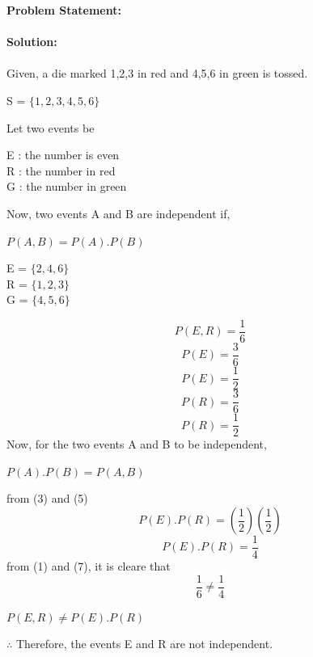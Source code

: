 \documentclass[10pt,a4paper]{report}
\begin{document}
\begin{multicols}{2}
\textbf{Problem Statement:}\vspace{2mm}
\\
\\
\textbf{Solution:}
\\
\\
Given, a die marked 1,2,3 in red and 4,5,6 in green is tossed.\\
\begin{center}
S = $\{1,2,3,4,5,6\}$
\end{center}
Let two events be
\begin{center}
E : the number is even\\
R : the number in red\\
G : the number in green\\
\end{center}
Now, two events A and B are independent if,
\begin{center} 
$\boxed{P(A,B) = P(A).P(B)}$
\end{center}
\begin{center} 
E = $\{2,4,6\}$\\
R = $\{1,2,3\}$\\
G = $\{4,5,6\}$
\end{center}
\begin{equation}
P(E,R) = \frac{1}{6}
\end{equation}
\begin{equation}
P(E) = \frac{3}{6}
\end{equation}
\begin{equation}
P(E) = \frac{1}{2}
\end{equation}
\begin{equation}
P(R) = \frac{3}{6}
\end{equation}
\begin{equation}
P(R) = \frac{1}{2}
\end{equation}
Now, for the two events A and B to be independent,
\begin{center} 
$P(A).P(B) = P(A,B)$
\end{center}
from  (3) and (5)
\begin{equation}
P(E).P(R) = \left(\frac{1}{2}\right)\left(\frac{1}{2}\right)
\end{equation}
\begin{equation}
P(E).P(R) = \frac{1}{4}
\end{equation}
from (1) and (7), it is cleare that
\begin{equation}
\frac{1}{6} \neq \frac{1}{4}
\end{equation}
\begin{center} 
$\boxed{P(E,R) \neq P(E).P(R)}$
\end{center}
$\therefore$ Therefore, the events E and R are not independent.
\end{multicols}
\end{document}
